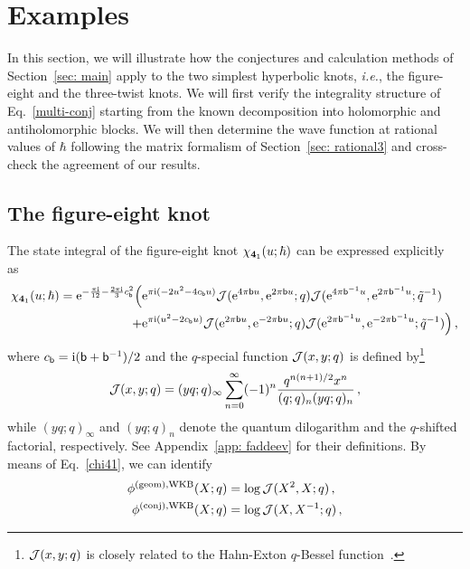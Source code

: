 \documentclass[a4paper,11pt]{article}
\theoremstyle{definition}
\newcommand{\CJ}{{\cal J}}
\newcommand{\re}{{\rm e}}
\newcommand{\ri}{{\rm i}}
\def\tq{{\tilde{q}}}
\def\tq{{\tilde{q}}}
\newcommand{\mb}{{\mathsf{b}}}
\newcommand{\be}{\begin{equation}}
\newcommand{\ee}{\end{equation}}
\newcommand{\ba}{\begin{aligned}}
\newcommand{\ea}{\end{aligned}}
\begin{document}
\section{Examples} \label{sec: examples}
In this section, we will illustrate how the conjectures and calculation methods of Section~\ref{sec: main} apply to the two simplest hyperbolic knots, {\it i.e.}, the figure-eight and the three-twist knots. We will first verify the integrality structure of Eq.~\eqref{multi-conj} starting from the known decomposition into holomorphic and antiholomorphic blocks. We will then determine the wave function at rational values of $\hbar$ following the matrix formalism of Section~\ref{sec: rational3} and cross-check the agreement of our results. 

\subsection{The figure-eight knot} \label{sec: 41}
The state integral of the figure-eight knot $\chi_{{\bf{4}}_1}(u;\hbar)$ can be expressed explicitly as~\cite{bdp,dimofte-levelk,ggm2}
%
 \be \label{chi41}
 \ba
 \chi_{{\bf{4}}_1}(u;\hbar)=\re^{-\frac{\pi\ri}{12}-\frac{2\pi\ri}{3}c_\mb^2} \Big(
    &\re^{\pi\ri(-2u^2-4c_\mb u)}
     \CJ(\re^{4\pi\mb u},\re^{2\pi\mb u};q)
     \CJ(\re^{4\pi\mb^{-1}u},\re^{2\pi\mb^{-1} u};\tq^{-1})\\
     +&\re^{\pi\ri(u^2-2c_\mb u)}
     \CJ(\re^{2\pi\mb u},\re^{-2\pi\mb u};q)
     \CJ(\re^{2\pi\mb^{-1}u},\re^{-2\pi\mb^{-1} u};\tq^{-1})
      \Big) \, ,
\ea
\ee
%
where $c_{\mb}= \ri (\mb + \mb^{-1})/2$ and the $q$-special function $\CJ(x,y;q)$ is defined by\footnote{$\CJ(x,y;q)$ is closely related to the Hahn-Exton $q$-Bessel function~\cite{swarttouw, swarttouw2}.} 
%
\begin{equation}
\CJ(x,y;q) = (y q;q)_\infty \sum_{n=0}^\infty (-1)^n \frac{q^{n(n+1)/2} x^n}{(q;q)_n (y q;q)_n} \, ,
\end{equation}
%
while $(y q;q)_\infty$ and $(y q;q)_n$ denote the quantum dilogarithm and the $q$-shifted factorial, respectively. See Appendix~\ref{app: faddeev} for their definitions.
By means of Eq.~\eqref{chi41}, we can identify
%
\begin{subequations}
\begin{align}
  \phi^{(\rm{geom}), \rm{WKB}}(X;q)& =  \log \CJ(X^2,X;q) \, , \label{phi41geom}\\
  \phi^{(\rm{conj}), \rm{WKB}}(X;q) &=  \log \CJ(X,X^{-1};q) \, , \label{phi41conj}
\end{align}
\end{subequations}
\end{document}
